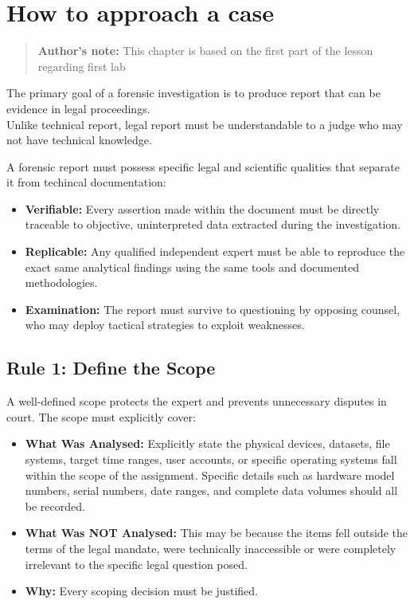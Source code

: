 \section{How to approach a case}
\begin{quotation}
    \textbf{Author's note:} This chapter is based on the first part of the lesson regarding first lab
\end{quotation}

\noindent
The primary goal of a forensic investigation is to produce report that can be evidence in legal proceedings.\\
Unlike technical report, legal report must be understandable to a judge who may not have technical knowledge.
\bigskip

\noindent
A forensic report must possess specific legal and scientific qualities that separate it from techincal documentation:
\begin{itemize}
    \item \textbf{Verifiable:} Every assertion made within the document must be directly traceable to objective, uninterpreted data extracted during the investigation.
    \item \textbf{Replicable:} Any qualified independent expert must be able to reproduce the exact same analytical findings using the same tools and documented methodologies.
    \item \textbf{Examination:} The report must survive to questioning by opposing counsel, who may deploy tactical strategies to exploit weaknesses.
\end{itemize}


\subsection{Rule 1: Define the Scope}
A well-defined scope protects the expert and prevents unnecessary disputes in court. The scope must explicitly cover:
\begin{itemize}
    \item \textbf{What Was Analysed:} Explicitly state the physical devices, datasets, file systems, target time ranges, user accounts, or specific operating systems fall within the scope of the assignment. Specific details such as hardware model numbers, serial numbers, date ranges, and complete data volumes should all be recorded.
    \item \textbf{What Was NOT Analysed:} This may be because the items fell outside the terms of the legal mandate, were technically inaccessible or were completely irrelevant to the specific legal question posed.
    \item \textbf{Why:} Every scoping decision must be justified.
\end{itemize}


